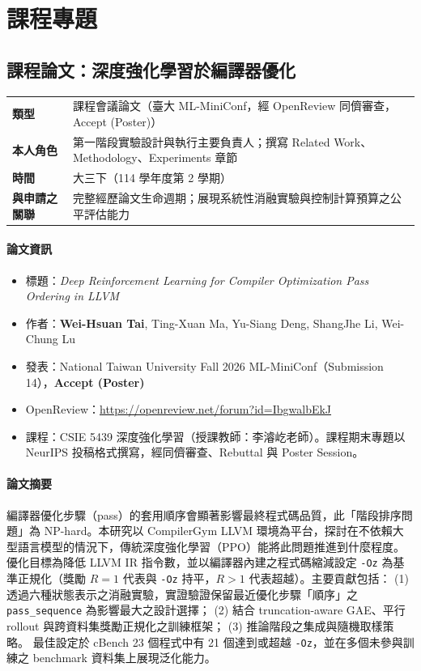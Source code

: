 \documentclass[12pt,a4paper]{article}
\newcommand{\itemsummary}[4]{%
\begin{center}
\begin{tabularx}{\linewidth}{>{\bfseries}l X}
\toprule
類型 & #1 \\
本人角色 & #2 \\
時間 & #3 \\
與申請之關聯 & #4 \\
\bottomrule
\end{tabularx}
\end{center}
}
\begin{document}
\section{課程專題}
\subsection{課程論文：深度強化學習於編譯器優化}

\itemsummary
{課程會議論文（臺大 ML-MiniConf，經 OpenReview 同儕審查，Accept (Poster)）}
{第一階段實驗設計與執行主要負責人；撰寫 Related Work、Methodology、Experiments 章節}
{大三下（114 學年度第 2 學期）}
{完整經歷論文生命週期；展現系統性消融實驗與控制計算預算之公平評估能力}

\paragraph{論文資訊}
\begin{itemize}[leftmargin=2em]
  \item 標題：\textit{Deep Reinforcement Learning for Compiler Optimization Pass Ordering in LLVM}
  \item 作者：\textbf{Wei-Hsuan Tai}, Ting-Xuan Ma, Yu-Siang Deng, ShangJhe Li, Wei-Chung Lu
  \item 發表：National Taiwan University Fall 2026 ML-MiniConf（Submission 14），\textbf{Accept (Poster)}
  \item OpenReview：\url{https://openreview.net/forum?id=IbgwalbEkJ}
  \item 課程：CSIE 5439 深度強化學習（授課教師：李濬屹老師）。課程期末專題以 NeurIPS 投稿格式撰寫，經同儕審查、Rebuttal 與 Poster Session。
\end{itemize}

\paragraph{論文摘要}
編譯器優化步驟（pass）的套用順序會顯著影響最終程式碼品質，此「階段排序問題」為 NP-hard。本研究以 CompilerGym LLVM 環境為平台，探討在不依賴大型語言模型的情況下，傳統深度強化學習（PPO）能將此問題推進到什麼程度。優化目標為降低 LLVM IR 指令數，並以編譯器內建之程式碼縮減設定 \texttt{-Oz} 為基準正規化（獎勵 $R=1$ 代表與 \texttt{-Oz} 持平，$R>1$ 代表超越）。主要貢獻包括：
(1) 透過六種狀態表示之消融實驗，實證驗證保留最近優化步驟「順序」之 \texttt{pass\_sequence} 為影響最大之設計選擇；
(2) 結合 truncation-aware GAE、平行 rollout 與跨資料集獎勵正規化之訓練框架；
(3) 推論階段之集成與隨機取樣策略。
最佳設定於 cBench 23 個程式中有 21 個達到或超越 \texttt{-Oz}，並在多個未參與訓練之 benchmark 資料集上展現泛化能力。
\end{document}
